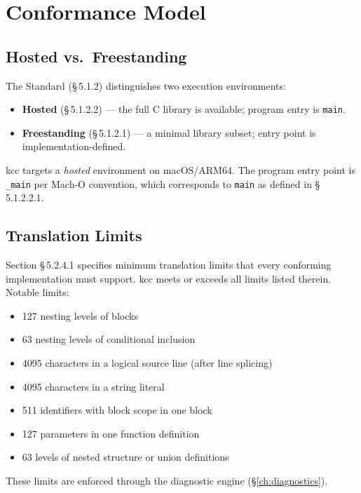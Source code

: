 \documentclass[11pt,a4paper,twoside,openright,DIV=15]{scrbook}
\theoremstyle{definition}
\theoremstyle{plain}
\theoremstyle{remark}
\newcommand{\stdref}[1]{\S\,#1}
\newcommand{\kcc}{\textsf{kcc}}
\begin{document}
\chapter{Conformance Model}
\label{ch:conformance}

\section{Hosted vs.\ Freestanding}

The Standard (\stdref{5.1.2}) distinguishes two execution environments:

\begin{itemize}
\item \textbf{Hosted} (\stdref{5.1.2.2}) --- the full C library is
      available; program entry is \texttt{main}.
\item \textbf{Freestanding} (\stdref{5.1.2.1}) --- a minimal library
      subset; entry point is implementation-defined.
\end{itemize}

\kcc{} targets a \emph{hosted} environment on macOS/ARM64.
The program entry point is \texttt{\_main} per Mach-O convention,
which corresponds to \texttt{main} as defined in \stdref{5.1.2.2.1}.

\section{Translation Limits}

Section \stdref{5.2.4.1} specifies minimum translation limits that
every conforming implementation must support.  \kcc{} meets or exceeds
all limits listed therein.  Notable limits:

\begin{itemize}
\item 127 nesting levels of blocks
\item 63 nesting levels of conditional inclusion
\item 4095 characters in a logical source line (after line splicing)
\item 4095 characters in a string literal
\item 511 identifiers with block scope in one block
\item 127 parameters in one function definition
\item 63 levels of nested structure or union definitions
\end{itemize}

These limits are enforced through the diagnostic engine
(\S\ref{ch:diagnostics}).
\end{document}
